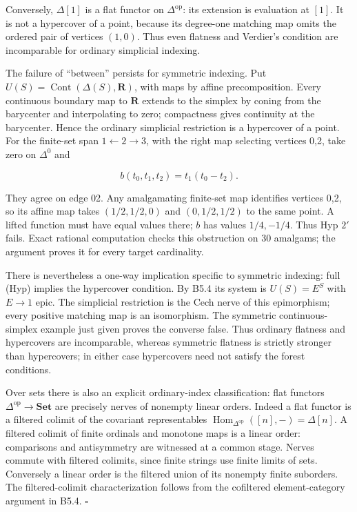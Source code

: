 Conversely, \(\Delta[1]\) is a flat functor on \(\Delta^{\mathrm{op}}\):
its extension is evaluation at \([1]\). It is not a hypercover of a
point, because its degree-one matching map omits the ordered pair of
vertices \((1,0)\). Thus even flatness and Verdier's condition are
incomparable for ordinary simplicial indexing.

The failure of ``between'' persists for symmetric indexing. Put
\(U(S)=\operatorname{Cont}(\Delta(S),\mathbf R)\), with maps by affine
precomposition. Every continuous boundary map to \(\mathbf R\) extends
to the simplex by coning from the barycenter and interpolating to zero;
compactness gives continuity at the barycenter. Hence the ordinary
simplicial restriction is a hypercover of a point. For the finite-set
span \(1\leftarrow2\to3\), with the right map selecting vertices 0,2,
take zero on \(\Delta^0\) and

\[b(t_0,t_1,t_2)=t_1(t_0-t_2).\]

They agree on edge 02. Any amalgamating finite-set map identifies
vertices 0,2, so its affine map takes \((1/2,1/2,0)\) and
\((0,1/2,1/2)\) to the same point. A lifted function must have equal
values there; \(b\) has values \(1/4,-1/4\). Thus Hyp \(2'\) fails.
Exact rational computation checks this obstruction on 30 amalgams; the
argument proves it for every target cardinality.

There is nevertheless a one-way implication specific to symmetric
indexing: full (Hyp) implies the hypercover condition. By B5.4 its system
is \(U(S)=E^S\) with \(E\to1\) epic. The simplicial restriction is the
Cech nerve of this epimorphism; every positive matching map is an
isomorphism. The symmetric continuous-simplex example just given proves
the converse false. Thus ordinary flatness and hypercovers are
incomparable, whereas symmetric flatness is strictly stronger than
hypercovers; in either case hypercovers need not satisfy the forest
conditions.

Over sets there is also an explicit ordinary-index classification: flat
functors \(\Delta^{\mathrm{op}}\to\mathbf{Set}\) are precisely nerves of
nonempty linear orders. Indeed a flat functor is a filtered colimit of
the covariant representables
\(\operatorname{Hom}_{\Delta^{\mathrm{op}}}([n],-)=\Delta[n]\). A
filtered colimit of finite ordinals and monotone maps is a linear order:
comparisons and antisymmetry are witnessed at a common stage. Nerves
commute with filtered colimits, since finite strings use finite limits
of sets. Conversely a linear order is the filtered union of its nonempty
finite suborders. The filtered-colimit characterization follows from the
cofiltered element-category argument in B5.4. \(\square\)

